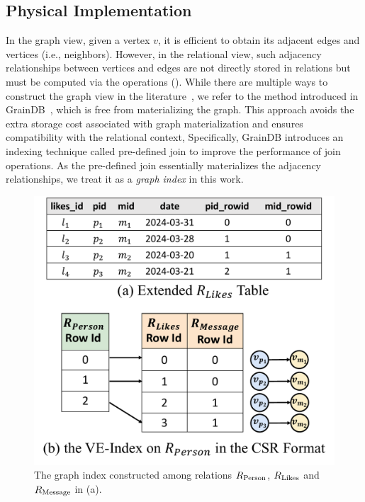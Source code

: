 

\subsection{Physical Implementation}
\label{sec:physical-operators}

In the graph view, given a vertex $v$, it is efficient to obtain its adjacent edges and vertices (i.e., neighbors). However, in the relational view, such adjacency relationships between vertices and edges are not directly stored in relations but must be computed via the \EVjoin operations (). While there are multiple ways to construct the graph view in the literature~\cite{gart,GRFusion}, we refer to the method introduced in GrainDB~\cite{graindb}, which is free from materializing the graph. This approach avoids the extra storage cost associated with graph materialization and ensures compatibility with the relational context,
Specifically, GrainDB introduces an indexing technique called pre-defined join to improve the performance of join operations. As the pre-defined join essentially materializes the adjacency relationships, we treat it as a \emph{graph index} in this work.

\begin{figure}
    \centering
    \includegraphics[width=.7\linewidth]{./figures/graph-index-likes.pdf}
    \caption{The graph index constructed among relations ${R_{\text{Person}}}$, ${R_{\text{Likes}}}$
    and ${R_{\text{Message}}}$ in (a).}
    \label{fig:graph-index}
\end{figure}

